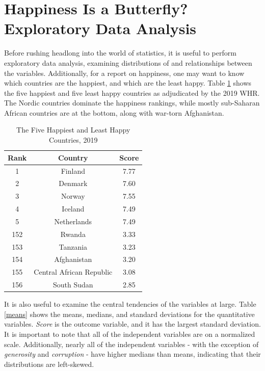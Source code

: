 \documentclass{article}
\begin{document}
\section{Happiness Is a Butterfly? Exploratory Data Analysis}
Before rushing headlong into the world of statistics, it is useful to perform exploratory data analysis, examining distributions of and relationships between the variables. Additionally, for a report on happiness, one may want to know which countries are the happiest, and which are the least happy. Table \ref{countries} shows the five happiest and five least happy countries as adjudicated by the 2019 WHR. The Nordic countries dominate the happiness rankings, while mostly sub-Saharan African countries are at the bottom, along with war-torn Afghanistan.

\begin{table}[H]
    \centering
    \begin{tabular}{c|cc}
         Rank&Country&Score\\\hline
         1&Finland&7.77\\
         2&Denmark&7.60\\
         3&Norway&7.55\\
         4&Iceland&7.49\\
         5&Netherlands&7.49\\\hline
         152&Rwanda&3.33\\
         153&Tanzania&3.23\\
         154&Afghanistan&3.20\\
         155&Central African Republic&3.08\\
         156&South Sudan&2.85
    \end{tabular}
    \caption{The Five Happiest and Least Happy Countries, 2019}
    \label{countries}
\end{table}

It is also useful to examine the central tendencies of the variables at large. Table \ref{means} shows the means, medians, and standard deviations for the quantitative variables. \textit{Score} is the outcome variable, and it has the largest standard deviation. It is important to note that all of the independent variables are on a normalized scale. Additionally, nearly all of the independent variables - with the exception of \textit{generosity} and \textit{corruption} - have higher medians than means, indicating that their distributions are left-skewed.
\end{document}
